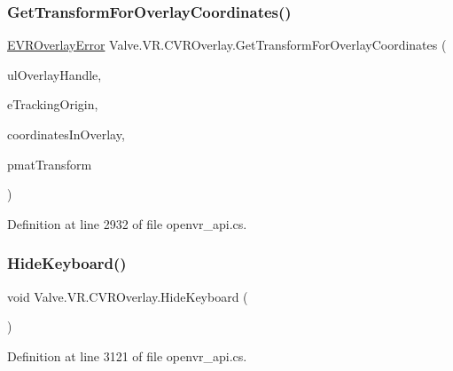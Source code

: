 \subsubsection{\texorpdfstring{GetTransformForOverlayCoordinates()}{GetTransformForOverlayCoordinates()}}
{\footnotesize\ttfamily \mbox{\hyperlink{namespace_valve_1_1_v_r_aaee5c5144f42b7969d45b854f51b0c18}{E\+V\+R\+Overlay\+Error}} Valve.\+V\+R.\+C\+V\+R\+Overlay.\+Get\+Transform\+For\+Overlay\+Coordinates (\begin{DoxyParamCaption}\item[{ulong}]{ul\+Overlay\+Handle,  }\item[{\mbox{\hyperlink{namespace_valve_1_1_v_r_a29be99a3c2f780157bd490db06a7f12f}{E\+Tracking\+Universe\+Origin}}}]{e\+Tracking\+Origin,  }\item[{\mbox{\hyperlink{struct_valve_1_1_v_r_1_1_hmd_vector2__t}{Hmd\+Vector2\+\_\+t}}}]{coordinates\+In\+Overlay,  }\item[{ref \mbox{\hyperlink{struct_valve_1_1_v_r_1_1_hmd_matrix34__t}{Hmd\+Matrix34\+\_\+t}}}]{pmat\+Transform }\end{DoxyParamCaption})}



Definition at line 2932 of file openvr\+\_\+api.\+cs.

\mbox{\label{class_valve_1_1_v_r_1_1_c_v_r_overlay_a2fa3d6db14e52d72267aebc1fec6de27}} 
\subsubsection{\texorpdfstring{HideKeyboard()}{HideKeyboard()}}
{\footnotesize\ttfamily void Valve.\+V\+R.\+C\+V\+R\+Overlay.\+Hide\+Keyboard (\begin{DoxyParamCaption}{ }\end{DoxyParamCaption})}



Definition at line 3121 of file openvr\+\_\+api.\+cs.

\mbox{\label{class_valve_1_1_v_r_1_1_c_v_r_overlay_a528c66aaede6c6da73daf0aa1e05186f}} 
